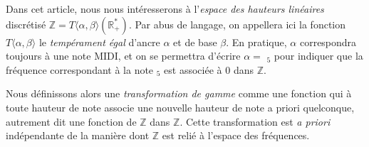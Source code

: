 \documentclass{article}
\begin{document}
Dans cet article, nous nous intéresserons à l'\emph{espace des hauteurs linéaires} discrétisé $\mathbb{Z} = T\langle\alpha, \beta \rangle (\mathbb{R^*_+})$. Par abus de langage, on appellera ici la fonction $T\langle \alpha, \beta \rangle$ le \emph{tempérament égal} d'ancre $\alpha$ et de base $\beta$. En pratique, $\alpha$ correspondra toujours à une note MIDI, et on se permettra d'écrire $\alpha =$ $_5$ pour indiquer que la fréquence correspondant à la note $_5$ est associée à $0$ dans $\mathbb{Z}$.

Nous définissons alors une \emph{transformation de gamme} comme une fonction qui à toute hauteur de note associe une nouvelle hauteur de note a priori quelconque, autrement dit une fonction de $\mathbb{Z}$ dans $\mathbb{Z}$. Cette transformation est \emph{a priori} indépendante de la manière dont $\mathbb{Z}$ est relié à l'espace des fréquences.
\end{document}
